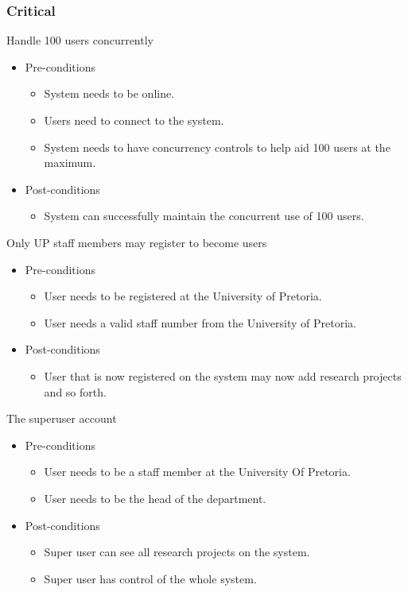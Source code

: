 \documentclass[a4paper,12pt]{report}
\begin{document}
\subsubsection{Critical}
	Handle 100 users concurrently
	\begin{itemize}
		\item Pre-conditions
			\begin{itemize}
				\item System needs to be online.
				\item Users need to connect to the system.
				\item System needs to have concurrency controls to help aid 100 users at the maximum.
			\end{itemize}
		\item Post-conditions
			\begin{itemize}
				\item System can successfully maintain the concurrent use of 100 users.
			\end{itemize}
	\end{itemize}

	Only UP staff members may register to become users
	\begin{itemize}
		\item Pre-conditions
			\begin{itemize}
				\item User needs to be registered at the University of Pretoria.
				\item User needs a valid staff number from the University of Pretoria.
			\end{itemize}
		\item Post-conditions
			\begin{itemize}
				\item User that is now registered on the system may now add research projects and so forth.
			\end{itemize}
	\end{itemize}

	The superuser account
	\begin{itemize}
		\item Pre-conditions
			\begin{itemize}
				\item User needs to be a staff member at the University Of Pretoria.
				\item User needs to be the head of the department.
			\end{itemize}
		\item Post-conditions
			\begin{itemize}
				\item Super user can see all research projects on the system.
				\item Super user has control of the whole system.
			\end{itemize}
	\end{itemize}
\end{document}
